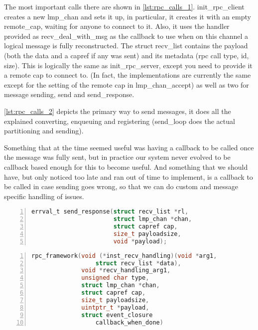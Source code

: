 The most important calls there are shown in \autoref{lst:rpc_calls_1}.
init\_rpc\_client creates a new lmp\_chan and sets it up, in particular, it 
creates it with an empty remote\_cap, waiting for anyone to connect to it. 
Also, it uses the handler provided as recv\_deal\_with\_msg as the callback to 
use when on this channel a logical message is fully reconstructed. The struct 
recv\_list contains the payload (both the data and a capref if any was sent) 
and its metadata (rpc call type, id, size).
This is logically the same as init\_rpc\_server, except you need to provide 
it a remote cap to connect to. (In fact, the implementations are currently the 
same except for the setting of the remote cap in lmp\_chan\_accept)
as well as two for message sending, send and send\_response.
\medskip

\autoref{lst:rpc_calls_2} depicts the primary way to send messages, it does 
all the explained converting, enqueuing and registering (send\_loop does the 
actual partitioning and sending).
\medskip

Something that at the time seemed useful was having a callback to be called 
once the message was fully sent, but in practice our system never evolved to 
be callback based enough for this to become useful. 
And something that we should have, but only noticed too late and ran out of 
time to implement, is a callback to be called in case sending goes wrong, so 
that we can do custom and message specific handling of issues.
\medskip

\begin{lstlisting}[caption={RPC send\_response}, 
label=lst:rpc_calls_3, numbers=left, stepnumber=1, float, floatplacement=tl, 
frame=tb, language=c]
errval_t send_response(struct recv_list *rl, 
                       struct lmp_chan *chan,
                       struct capref cap, 
                       size_t payloadsize, 
                       void *payload);
\end{lstlisting}
\begin{lstlisting}[caption={rpc\_framework}, 
label=lst:rpc_calls_4, numbers=left, stepnumber=1, float, floatplacement=tl, 
frame=tb, language=c]
rpc_framework(void (*inst_recv_handling)(void *arg1, 
                  struct recv_list *data),
              void *recv_handling_arg1,
              unsigned char type,
              struct lmp_chan *chan, 
              struct capref cap, 
              size_t payloadsize, 
              uintptr_t *payload,
              struct event_closure 
                  callback_when_done)
\end{lstlisting}


